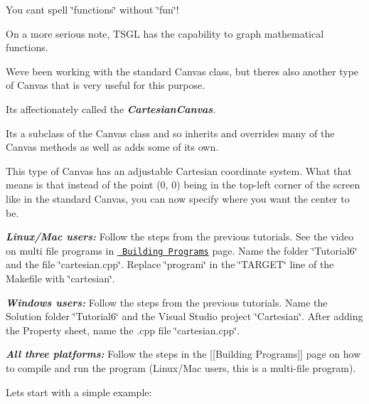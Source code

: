 You can\textquotesingle{}t spell \char`\"{}functions\char`\"{} without \char`\"{}fun\char`\"{}!

On a more serious note, T\+S\+GL has the capability to graph mathematical functions.

We\textquotesingle{}ve been working with the standard Canvas class, but there\textquotesingle{}s also another type of Canvas that is very useful for this purpose.

It\textquotesingle{}s affectionately called the {\itshape {\bfseries{Cartesian\+Canvas}}}.

Its a subclass of the Canvas class and so inherits and overrides many of the Canvas methods as well as adds some of its own.

This type of Canvas has an adjustable Cartesian coordinate system. What that means is that instead of the point {\ttfamily (0, 0)} being in the top-\/left corner of the screen like in the standard Canvas, you can now specify where you want the center to be.

{\itshape {\bfseries{Linux/\+Mac users\+:}}} Follow the steps from the previous tutorials. See the video on multi file programs in \href{https://github.com/Calvin-CS/TSGL/wiki/Building-Programs}{\texttt{ Building Programs}} page. Name the folder \char`\"{}\+Tutorial6\char`\"{} and the file \char`\"{}cartesian.\+cpp\char`\"{}. Replace \char`\"{}program\char`\"{} in the \char`\"{}\+T\+A\+R\+G\+E\+T\char`\"{} line of the Makefile with \char`\"{}cartesian\char`\"{}.

{\itshape {\bfseries{Windows users\+:}}} Follow the steps from the previous tutorials. Name the Solution folder \char`\"{}\+Tutorial6\char`\"{} and the Visual Studio project \char`\"{}\+Cartesian\char`\"{}. After adding the Property sheet, name the .cpp file \char`\"{}cartesian.\+cpp\char`\"{}.

{\itshape {\bfseries{All three platforms\+:}}} Follow the steps in the \mbox{[}\mbox{[}Building Programs\mbox{]}\mbox{]} page on how to compile and run the program (Linux/\+Mac users, this is a multi-\/file program).

Let\textquotesingle{}s start with a simple example\+:


\begin{DoxyCode}{0}
\DoxyCodeLine{\textcolor{preprocessor}{\#include <tsgl.h>}}
\DoxyCodeLine{}
\DoxyCodeLine{\}}
\end{DoxyCode}


